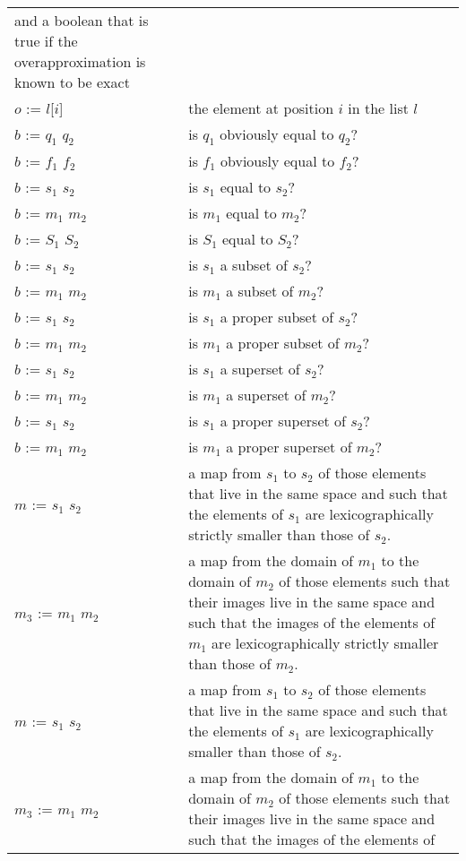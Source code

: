 \begin{supertabular}{p{0.35\textwidth}p{0.6\textwidth}}
and a boolean that is true if the overapproximation
is known to be exact
\\
$o$ := $l$[$i$] &
the element at position $i$ in the list $l$
\\
$b$ := $q_1$ \ai[\tt]{==} $q_2$ & is $q_1$ obviously equal to $q_2$?
\\
$b$ := $f_1$ \ai[\tt]{==} $f_2$ & is $f_1$ obviously equal to $f_2$?
\\
$b$ := $s_1$ \ai[\tt]{=} $s_2$ & is $s_1$ equal to $s_2$?
\\
$b$ := $m_1$ \ai[\tt]{=} $m_2$ & is $m_1$ equal to $m_2$?
\\
$b$ := $S_1$ \ai[\tt]{=} $S_2$ & is $S_1$ equal to $S_2$?
\\
$b$ := $s_1$ \ai[\tt]{<=} $s_2$ & is $s_1$ a subset of $s_2$?
\\
$b$ := $m_1$ \ai[\tt]{<=} $m_2$ & is $m_1$ a subset of $m_2$?
\\
$b$ := $s_1$ \ai[\tt]{<} $s_2$ & is $s_1$ a proper subset of $s_2$?
\\
$b$ := $m_1$ \ai[\tt]{<} $m_2$ & is $m_1$ a proper subset of $m_2$?
\\
$b$ := $s_1$ \ai[\tt]{>=} $s_2$ & is $s_1$ a superset of $s_2$?
\\
$b$ := $m_1$ \ai[\tt]{>=} $m_2$ & is $m_1$ a superset of $m_2$?
\\
$b$ := $s_1$ \ai[\tt]{>} $s_2$ & is $s_1$ a proper superset of $s_2$?
\\
$b$ := $m_1$ \ai[\tt]{>} $m_2$ & is $m_1$ a proper superset of $m_2$?
\\
$m$ := $s_1$ \ai[\tt]{<<} $s_2$ & a map from
$s_1$ to $s_2$ of those elements that live in the same space and
such that the elements of $s_1$ are lexicographically strictly smaller
than those of $s_2$.
\\
$m_3$ := $m_1$ \ai[\tt]{<<} $m_2$ & a map from the domain of
$m_1$ to the domain of $m_2$ of those elements such that their images
live in the same space and such that the images of the elements of
$m_1$ are lexicographically strictly smaller than those of $m_2$.
\\
$m$ := $s_1$ \ai[\tt]{<<=} $s_2$ & a map from
$s_1$ to $s_2$ of those elements that live in the same space and
such that the elements of $s_1$ are lexicographically smaller
than those of $s_2$.
\\
$m_3$ := $m_1$ \ai[\tt]{<<=} $m_2$ & a map from the domain of
$m_1$ to the domain of $m_2$ of those elements such that their images
live in the same space and such that the images of the elements of

\end{supertabular}

